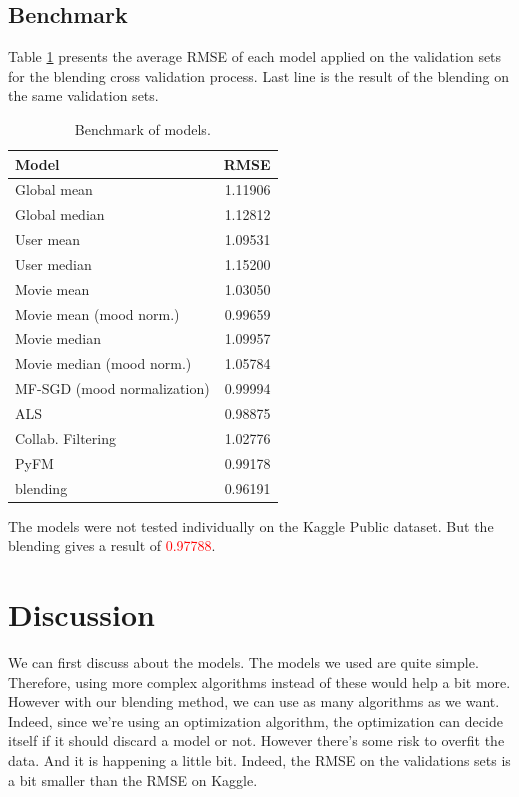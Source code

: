 \documentclass[10pt,conference,compsocconf]{IEEEtran}
\begin{document}
\subsection{Benchmark}
\label{sec:model_bench}

Table \ref{benchmark} presents the average RMSE of each model applied on the validation sets for the blending cross validation process. Last line is the result of the blending on the same validation sets.

\begin{table}[htbp]
\centering
\begin{tabular}[c]{| l r |}
\hline
Model & RMSE \\
\hline 
\hline
Global mean			& 1.11906 \\
Global median			& 1.12812 \\
User mean			& 1.09531 \\
User median			& 1.15200 \\
Movie mean			& 1.03050 \\
Movie mean (mood norm.)		& 0.99659 \\
Movie median			& 1.09957 \\
Movie median (mood norm.)	& 1.05784 \\
MF-SGD (mood normalization)	& 0.99994 \\
ALS				& 0.98875 \\
Collab. Filtering		& 1.02776 \\
PyFM				& 0.99178 \\ \hline\hline
blending			& 0.96191 \\ 
\hline
\end{tabular}
  \caption{Benchmark of models.}
  \label{benchmark}
\end{table}

The models were not tested individually on the Kaggle Public dataset. But the blending gives a result of \textcolor{red}{0.97788}. 

\section{Discussion}

We can first discuss about the models. The models we used are quite simple. Therefore, using more complex algorithms instead of these would help a bit more. However with our blending method, we can use as many algorithms as we want. Indeed, since we're using an optimization algorithm, the optimization can decide itself if it should discard a model or not. However there's some risk to overfit the data. And it is happening a little bit. Indeed, the RMSE on the validations sets is a bit smaller than the RMSE on Kaggle. 
\end{document}
